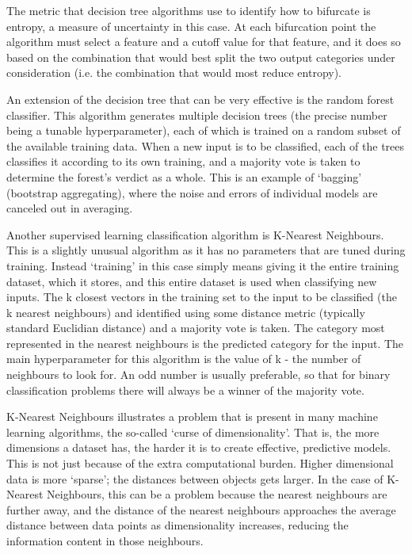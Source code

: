 The metric that decision tree algorithms use to identify how to bifurcate is entropy, a measure of uncertainty in this case. At each bifurcation point the algorithm must select a feature and a cutoff value for that feature, and it does so based on the combination that would best split the two output categories under consideration (i.e. the combination that would most reduce entropy).

An extension of the decision tree that can be very effective is the random forest classifier. This algorithm generates multiple decision trees (the precise number being a tunable hyperparameter), each of which is trained on a random subset of the available training data. When a new input is to be classified, each of the trees classifies it according to its own training, and a majority vote is taken to determine the forest's verdict as a whole. This is an example of `bagging' (bootstrap aggregating), where the noise and errors of individual models are canceled out in averaging.

Another supervised learning classification algorithm is K-Nearest Neighbours. This is a slightly unusual algorithm as it has no parameters that are tuned during training. Instead `training' in this case simply means giving it the entire training dataset, which it stores, and this entire dataset is used when classifying new inputs. The k closest vectors in the training set to the input to be classified (the k nearest neighbours) and identified using some distance metric (typically standard Euclidian distance) and a majority vote is taken. The category most represented in the nearest neighbours is the predicted category for the input. The main hyperparameter for this algorithm is the value of k - the number of neighbours to look for. An odd number is usually preferable, so that for binary classification problems there will always be a winner of the majority vote.

K-Nearest Neighbours illustrates a problem that is present in many machine learning algorithms, the so-called `curse of dimensionality'. That is, the more dimensions a dataset has, the harder it is to create effective, predictive models. This is not just because of the extra computational burden. Higher dimensional data is more `sparse'; the distances between objects gets larger. In the case of K-Nearest Neighbours, this can be a problem because the nearest neighbours are further away, and the distance of the nearest neighbours approaches the average distance between data points as dimensionality increases, reducing the information content in those neighbours.

